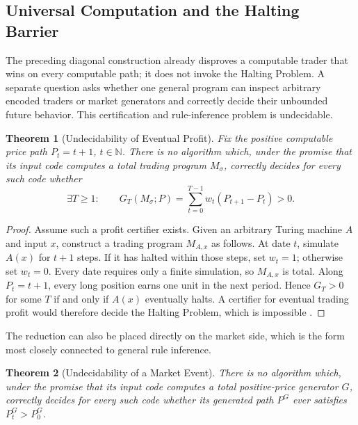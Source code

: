 \documentclass[aps,pra,reprint,superscriptaddress,amsmath,amssymb,floatfix]{revtex4-2}
\theoremstyle{plain}
\newtheorem{theorem}{Theorem}
\theoremstyle{definition}
\theoremstyle{remark}
\begin{document}
\subsection{Universal Computation and the Halting Barrier}

The preceding diagonal construction already disproves a computable trader that
wins on every computable path; it does not invoke the Halting Problem. A
separate question asks whether one general program can inspect arbitrary
encoded traders or market generators and correctly decide their unbounded
future behavior. This certification and rule-inference problem is
undecidable.

\begin{theorem}[Undecidability of Eventual Profit]
  \label{thm:profit-undecidable}
  Fix the positive computable price path \(P_t=t+1\), \(t\in\mathbb{N}\).
  There is no algorithm which, under the promise that its input code computes
  a total trading program \(M_\sigma\), correctly decides for every such code
  whether
  \[
    \exists T\geq1:\qquad
    G_T(M_\sigma;P)=
    \sum_{t=0}^{T-1}w_t(P_{t+1}-P_t)>0.
  \]
\end{theorem}

\begin{proof}
Assume such a profit certifier exists. Given an arbitrary Turing machine
\(A\) and input \(x\), construct a trading program \(M_{A,x}\) as follows.
At date \(t\), simulate \(A(x)\) for \(t+1\) steps. If it has halted within
those steps, set \(w_t=1\); otherwise set \(w_t=0\). Every date requires only
a finite simulation, so \(M_{A,x}\) is total. Along \(P_t=t+1\), every long
position earns one unit in the next period. Hence \(G_T>0\) for some \(T\) if
and only if \(A(x)\) eventually halts. A certifier for eventual trading profit
would therefore decide the Halting Problem, which is impossible
\cite{turing-36}.
\end{proof}

The reduction can also be placed directly on the market side, which is the
form most closely connected to general rule inference.

\begin{theorem}[Undecidability of a Market Event]
  \label{thm:market-undecidable}
  There is no algorithm which, under the promise that its input code computes
  a total positive-price generator \(G\), correctly decides for every such
  code whether its generated path \(P^G\) ever satisfies \(P_t^G>P_0^G\).
\end{theorem}
\end{document}
